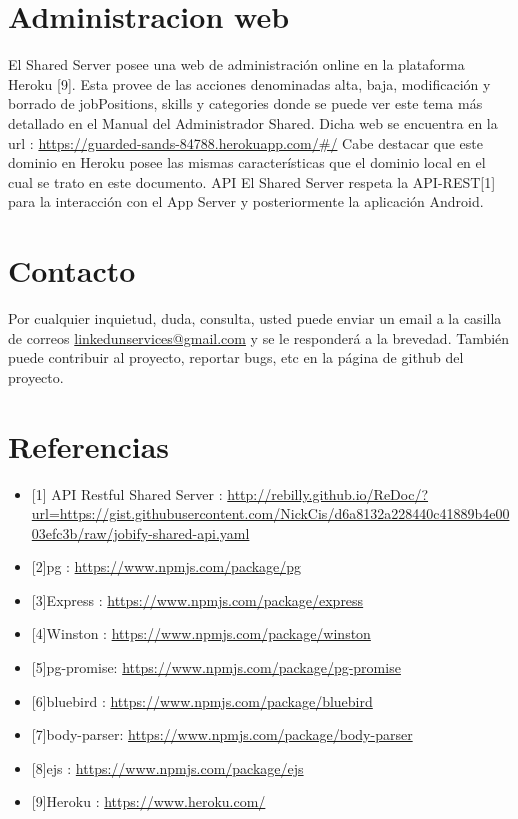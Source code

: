 \documentclass[a4paper,10pt,spanish]{sphinxmanual}
\begin{document}
\section{Administracion web}
\label{sharedServer:administracion-web}
El Shared Server posee una web de administración online en la plataforma Heroku {[}9{]}. Esta provee de las acciones denominadas alta, baja, modificación y borrado de jobPositions, skills y  categories donde se puede ver este tema más detallado en el Manual del Administrador Shared. Dicha web se encuentra en la url : \url{https://guarded-sands-84788.herokuapp.com/\#/}
Cabe destacar que este dominio en Heroku posee las mismas características que el dominio local en el cual se trato en este documento.
API
El Shared Server respeta la API-REST{[}1{]} para la interacción con el App Server y posteriormente la aplicación Android.


\section{Contacto}
\label{sharedServer:contacto}
Por cualquier inquietud, duda, consulta, usted puede enviar un email a la casilla de correos
\href{mailto:linkedunservices@gmail.com}{linkedunservices@gmail.com} y se le responderá a la brevedad.
También puede contribuir al proyecto, reportar bugs, etc en la página de github del proyecto.


\section{Referencias}
\label{sharedServer:referencias}\begin{itemize}
\item {} 
{[}1{]} API Restful Shared Server : \url{http://rebilly.github.io/ReDoc/?url=https://gist.githubusercontent.com/NickCis/d6a8132a228440c41889b4e0003efc3b/raw/jobify-shared-api.yaml}

\item {} 
{[}2{]}pg : \url{https://www.npmjs.com/package/pg}

\item {} 
{[}3{]}Express : \url{https://www.npmjs.com/package/express}

\item {} 
{[}4{]}Winston : \url{https://www.npmjs.com/package/winston}

\item {} 
{[}5{]}pg-promise: \url{https://www.npmjs.com/package/pg-promise}

\item {} 
{[}6{]}bluebird : \url{https://www.npmjs.com/package/bluebird}

\item {} 
{[}7{]}body-parser: \url{https://www.npmjs.com/package/body-parser}

\item {} 
{[}8{]}ejs : \url{https://www.npmjs.com/package/ejs}

\item {} 
{[}9{]}Heroku : \url{https://www.heroku.com/}

\end{itemize}



\renewcommand{\indexname}{Índice}
\printindex
\end{document}
